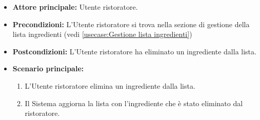 \label{usecase:Elimina ingrediente}
\begin{itemize}

	\item \textbf{Attore principale:} Utente ristoratore.

	\item \textbf{Precondizioni:} L'Utente ristoratore si trova nella sezione di gestione della lista ingredienti (vedi \autoref{usecase:Gestione lista ingredienti})

	\item \textbf{Postcondizioni:} L'Utente ristoratore ha eliminato un ingrediente dalla lista.

	\item \textbf{Scenario principale:}
	\begin{enumerate}
		\item L'Utente ristoratore elimina un ingrediente dalla lista.
		\item Il Sistema aggiorna la lista con l'ingrediente che è stato eliminato dal ristoratore.
	\end{enumerate}

\end{itemize}
